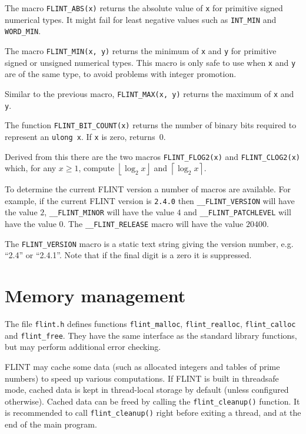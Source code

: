 \documentclass[a4paper,10pt]{book}
\providecommand{\floor}[1]{\left\lfloor#1\right\rfloor}%
\providecommand{\ceil}[1]{\left\lceil#1\right\rceil}%
\newcommand{\code}{\lstinline}
\begin{document}
The macro \code{FLINT_ABS(x)} returns the absolute value of \code{x}
for primitive signed numerical types.  It might fail for least negative
values such as \code{INT_MIN} and \code{WORD_MIN}.

The macro \code{FLINT_MIN(x, y)} returns the minimum of \code{x} and
\code{y} for primitive signed or unsigned numerical types.  This macro
is only safe to use when \code{x} and \code{y} are of the same type,
to avoid problems with integer promotion.

Similar to the previous macro, \code{FLINT_MAX(x, y)} returns the
maximum of \code{x} and \code{y}.

The function \code{FLINT_BIT_COUNT(x)} returns the number of binary bits
required to represent an \code{ulong x}.  If \code{x} is zero,
returns~$0$.

Derived from this there are the two macros \code{FLINT_FLOG2(x)} and
\code{FLINT_CLOG2(x)} which, for any $x \geq 1$, compute $\floor{\log_2{x}}$
and $\ceil{\log_2{x}}$.

To determine the current FLINT version a number of macros are available.
For example, if the current FLINT version is \code{2.4.0} then
\code{__FLINT_VERSION} will have the value $2$, \code{__FLINT_MINOR}
will have the value $4$ and \code{__FLINT_PATCHLEVEL} will have the value
$0$. The \code{__FLINT_RELEASE} macro will have the value $20400$.

The \code{FLINT_VERSION} macro is a static text string giving the version
number, e.g. ``2.4'' or ``2.4.1''. Note that if the final digit is a zero
it is suppressed.

\chapter{Memory management}

The file \code{flint.h} defines functions \code{flint_malloc},
\code{flint_realloc}, \code{flint_calloc} and \code{flint_free}.
They have the same interface as the standard library functions, but
may perform additional error checking.

FLINT may cache some data (such as allocated integers
and tables of prime numbers) to speed up various computations.
If FLINT is built in threadsafe mode, cached data is kept in thread-local
storage by default (unless configured otherwise). Cached data can be freed
by calling the \code{flint_cleanup()} function. It is recommended to call
\code{flint_cleanup()} right before exiting a thread, and at the end of the
main program.
\end{document}
